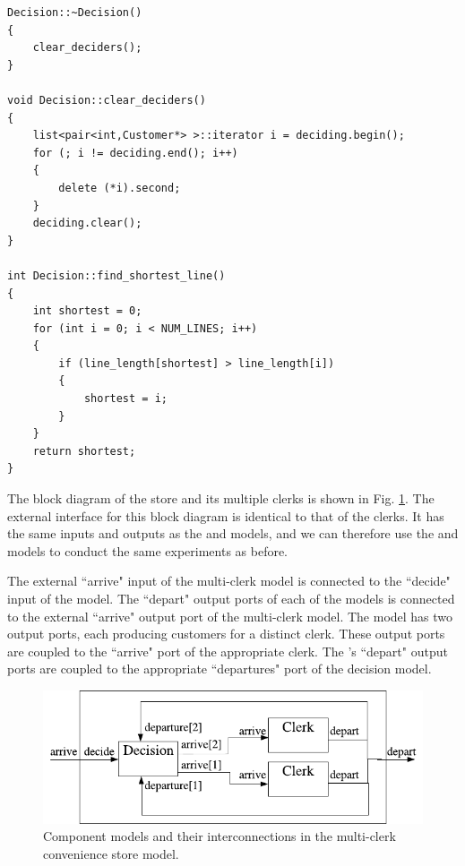 \begin{verbatim}
Decision::~Decision()
{
    clear_deciders();
}

void Decision::clear_deciders()
{
    list<pair<int,Customer*> >::iterator i = deciding.begin();
    for (; i != deciding.end(); i++)
    {
        delete (*i).second;
    }
    deciding.clear();
}

int Decision::find_shortest_line()
{
    int shortest = 0;
    for (int i = 0; i < NUM_LINES; i++)
    {
        if (line_length[shortest] > line_length[i])
        {
            shortest = i;
        }
    }
    return shortest;
}
\end{verbatim}

The block diagram of the store and its multiple clerks is shown in Fig. \ref{fig:multi_clerk_diagram}. The external interface for this block diagram is identical to that of the clerks. It has the same inputs and outputs as the  and  models, and we can therefore use the  and  models to conduct the same experiments as before.

The external ``arrive" input of the multi-clerk model is connected to the ``decide" input of the  model. The ``depart" output ports of each of the  models is connected to the external ``arrive" output port of the multi-clerk model. The  model has two output ports, each producing customers for a distinct clerk. These output ports are coupled to the ``arrive" port of the appropriate clerk. The 's ``depart" output ports are coupled to the appropriate ``departures" port of the decision model.
\begin{figure}[ht]
\centering
\includegraphics{network_models_figs/multi_clerk_diagram.pdf}
\caption{Component models and their interconnections in the multi-clerk convenience store model.}
\label{fig:multi_clerk_diagram}
\end{figure}

